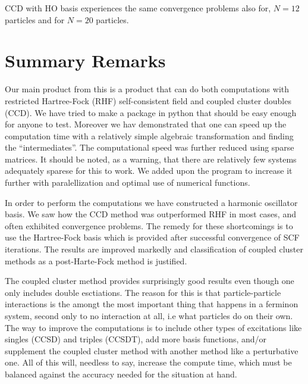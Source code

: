 \documentclass[
    a4paper, aps, twocolumn, floatfix, superscriptaddress,
    nofootinbib]{revtex4-1}
\newcommand{\1}{\mathds{1}}
\begin{document}
        CCD with HO basis experiences the same convergence problems also for,
        $N=12$ particles and for $N=20$ particles.


    \section{Summary Remarks}

        Our main product from this is a product that can do both computations with
        restricted Hartree-Fock (RHF) self-consistent field and coupled cluster
        doubles (CCD). We have tried
        to make a package in python that should be easy enough for anyone to test.
        Moreover we hav demonstrated that one can speed up the computation time with
        a relatively simple algebraic transformation and finding the ``intermediates''.
        The computational speed was further reduced using sparse matrices. It should
        be noted, as a warning, that there are relatively few systems adequately sparese
        for this to work. We added upon the program to increase it further with
        paralellization and optimal use of numerical functions.

        In order to perform the computations we have constructed a harmonic oscillator
        basis. We saw how the CCD method was outperformed RHF in most cases, and often
        exhibited convergence problems. The remedy for these shortcomings is to use
        the Hartree-Fock basis which is provided after successful convergence of
        SCF iterations. The results are improved markedly and classification of coupled
        cluster methods as a post-Harte-Fock method is justified.

        The coupled cluster method provides surprisingly good results even
        though one only includes double esctiations. The reason for this is that
        particle-particle interactions is the amongt the most important thing that
        happens in a ferminon system, second only to no interaction at all, i.e
        what particles do on their own. The way to improve the computations is to
        include other types of excitations like singles (CCSD) and triples (CCSDT),
        add more basis functions, and/or supplement the coupled cluster method with
        another method like a perturbative one. All of this will, needless to say,
        increase the compute time, which must be balanced against the accuracy needed
        for the situation at hand.
\end{document}
